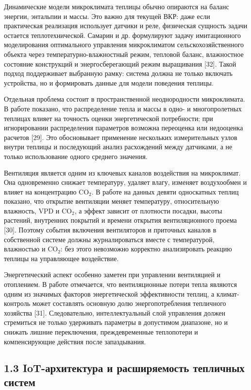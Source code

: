 \documentclass[a4paper,14pt]{extarticle}
\begin{document}
Динамические модели микроклимата теплицы обычно опираются на баланс
энергии, энтальпии и массы. Это важно для текущей ВКР: даже если
практическая реализация использует датчики и реле, физическая сущность
задачи остается теплотехнической. Самарин и др. формулируют задачу
имитационного моделирования оптимального управления микроклиматом
сельскохозяйственного объекта через температурно-влажностный режим,
тепловой баланс, влажностное состояние конструкций и энергосберегающий
режим выращивания {[}32{]}. Такой подход поддерживает выбранную рамку:
система должна не только включать устройства, но и формировать данные
для модели поведения теплицы.

Отдельная проблема состоит в пространственной неоднородности
микроклимата. В работе показано, что распределение тепла и массы в одно-
и многопролетных теплицах влияет на точность оценки энергетической
потребности; при игнорировании распределения параметров возможна
переоценка или недооценка расчетов {[}29{]}. Это обосновывает применение
нескольких измерительных узлов внутри теплицы и последующий анализ
расхождений между датчиками, а не только использование одного среднего
значения.

Вентиляция является одним из ключевых каналов воздействия на
микроклимат. Она одновременно снижает температуру, удаляет влагу,
изменяет воздухообмен и влияет на концентрацию CO\(_2\). В работе на
данных девяти односкатных теплиц показано, что открытие вентиляции
меняет температуру, относительную влажность, VPD и CO\(_2\), а эффект
зависит от плотности посадки, высоты растений, внутренних покрытий и
времени открытия вентиляционного проема {[}30{]}. Поэтому события
включения вентиляторов и приточных каналов в собственной системе должны
журналироваться вместе с температурой, влажностью и CO\(_2\): без этого
невозможно корректно анализировать реакцию теплицы на управляющее
воздействие.

Энергетический аспект особенно заметен при управлении вентиляцией и
отоплением. В работе отмечается, что вентиляционные потери тепла
являются одним из значимых факторов энергетической эффективности теплиц,
а климат-контроль может составлять основную долю энергопотребления
тепличного хозяйства {[}31{]}. Следовательно, интеллектуальный слой
управления должен стремиться не только удерживать параметры в допустимом
диапазоне, но и снижать лишние переключения, преждевременные теплопотери
и компенсирующие действия после запаздывания.

\hypertarget{iot-ux430ux440ux445ux438ux442ux435ux43aux442ux443ux440ux430-ux438-ux440ux430ux441ux448ux438ux440ux44fux435ux43cux43eux441ux442ux44c-ux442ux435ux43fux43bux438ux447ux43dux44bux445-ux441ux438ux441ux442ux435ux43c}{%
\subsection{1.3 IoT-архитектура и расширяемость тепличных
систем}\label{iot-ux430ux440ux445ux438ux442ux435ux43aux442ux443ux440ux430-ux438-ux440ux430ux441ux448ux438ux440ux44fux435ux43cux43eux441ux442ux44c-ux442ux435ux43fux43bux438ux447ux43dux44bux445-ux441ux438ux441ux442ux435ux43c}}
\end{document}
